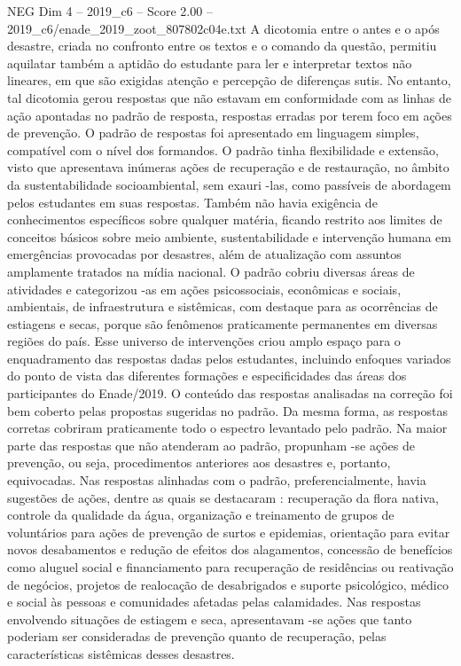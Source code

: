 \begin{textsample}{NEG Dim 4 – 2019\_c6 – Score 2.00 – 2019\_c6/enade\_2019\_zoot\_807802c04e.txt}
A dicotomia entre o antes e o após desastre, criada no confronto entre os textos e o comando da questão, permitiu aquilatar também a aptidão do estudante para ler e interpretar textos não lineares, em que são exigidas atenção e percepção de diferenças sutis.
No entanto, tal dicotomia gerou respostas que não estavam em conformidade com as linhas de ação apontadas no padrão de resposta, respostas erradas por terem foco em ações de prevenção.
O padrão de respostas foi apresentado em linguagem simples, compatível com o nível dos formandos.
O padrão tinha flexibilidade e extensão, visto que apresentava inúmeras ações de recuperação e de restauração, no âmbito da sustentabilidade socioambiental, sem exauri -las, como passíveis de abordagem pelos estudantes em suas respostas.
Também não havia exigência de conhecimentos específicos sobre qualquer matéria, ficando restrito aos limites de conceitos básicos sobre meio ambiente, sustentabilidade e intervenção humana em emergências provocadas por desastres, além de atualização com assuntos amplamente tratados na mídia nacional.
O padrão cobriu diversas áreas de atividades e categorizou -as em ações psicossociais, econômicas e sociais, ambientais, de infraestrutura e sistêmicas, com destaque para as ocorrências de estiagens e secas, porque são fenômenos praticamente permanentes em diversas regiões do país.
Esse universo de intervenções criou amplo espaço para o enquadramento das respostas dadas pelos estudantes, incluindo enfoques variados do ponto de vista das diferentes formações e especificidades das áreas dos participantes do Enade/2019.
O conteúdo das respostas analisadas na correção foi bem coberto pelas propostas sugeridas no padrão.
Da mesma forma, as respostas corretas cobriram praticamente todo o espectro levantado pelo padrão.
Na maior parte das respostas que não atenderam ao padrão, propunham -se ações de prevenção, ou seja, procedimentos anteriores aos desastres e, portanto, equivocadas.
Nas respostas alinhadas com o padrão, preferencialmente, havia sugestões de ações, dentre as quais se destacaram : recuperação da flora nativa, controle da qualidade da água, organização e treinamento de grupos de voluntários para ações de prevenção de surtos e epidemias, orientação para evitar novos desabamentos e redução de efeitos dos alagamentos, concessão de benefícios como aluguel social e financiamento para recuperação de residências ou reativação de negócios, projetos de realocação de desabrigados e suporte psicológico, médico e social às pessoas e comunidades afetadas pelas calamidades.
Nas respostas envolvendo situações de estiagem e seca, apresentavam -se ações que tanto poderiam ser consideradas de prevenção quanto de recuperação, pelas características sistêmicas desses desastres.

\end{textsample}
